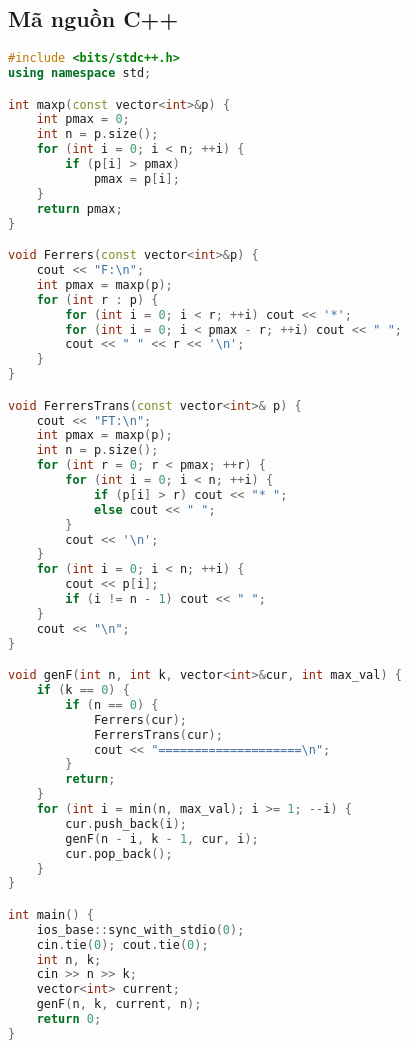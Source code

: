 \documentclass[12pt]{article}
\begin{document}
\subsection*{Mã nguồn C++}
\begin{lstlisting}[language=C++, basicstyle=\ttfamily\footnotesize, frame=single]
#include <bits/stdc++.h>
using namespace std;

int maxp(const vector<int>&p) {
    int pmax = 0;
    int n = p.size();
    for (int i = 0; i < n; ++i) {
        if (p[i] > pmax)
            pmax = p[i];
    }
    return pmax;
}

void Ferrers(const vector<int>&p) {
    cout << "F:\n";
    int pmax = maxp(p);
    for (int r : p) {
        for (int i = 0; i < r; ++i) cout << '*';
        for (int i = 0; i < pmax - r; ++i) cout << " ";
        cout << " " << r << '\n';
    }
}

void FerrersTrans(const vector<int>& p) {
    cout << "FT:\n";
    int pmax = maxp(p);
    int n = p.size();
    for (int r = 0; r < pmax; ++r) {
        for (int i = 0; i < n; ++i) {
            if (p[i] > r) cout << "* ";
            else cout << " ";
        }
        cout << '\n';
    }
    for (int i = 0; i < n; ++i) {
        cout << p[i];
        if (i != n - 1) cout << " ";
    }
    cout << "\n";
}

void genF(int n, int k, vector<int>&cur, int max_val) {
    if (k == 0) {
        if (n == 0) {
            Ferrers(cur);
            FerrersTrans(cur);
            cout << "====================\n";
        }
        return;
    }
    for (int i = min(n, max_val); i >= 1; --i) {
        cur.push_back(i);
        genF(n - i, k - 1, cur, i);
        cur.pop_back();
    }
}

int main() {
    ios_base::sync_with_stdio(0);
    cin.tie(0); cout.tie(0);
    int n, k;
    cin >> n >> k;
    vector<int> current;
    genF(n, k, current, n);
    return 0;
}
\end{lstlisting}
\end{document}
